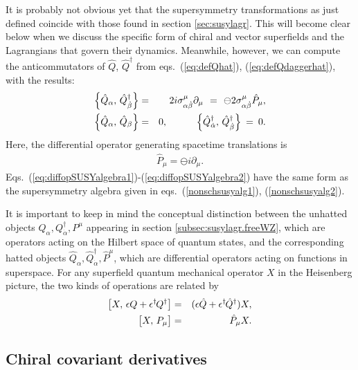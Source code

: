 \documentclass[11pt]{article}
\def\BDpos{}
\def\BDpos{-}
\def\BDpos{\oplus}
\def\BDpos{\ominus}
\def\beq{\begin{eqnarray}}
\def\eeq{\end{eqnarray}}
\begin{document}
It is probably not obvious yet that the supersymmetry transformations as 
just defined coincide with those found in section \ref{sec:susylagr}. 
This will become clear below when we discuss the specific form of chiral 
and vector superfields and the Lagrangians that govern their dynamics. 
Meanwhile, however, we can compute the anticommutators of $\hat Q$, $\hat 
Q^\dagger$ from eqs.~(\ref{eq:defQhat}), (\ref{eq:defQdaggerhat}), with 
the results:
\beq
\Bigl \lbrace \hat Q_\alpha,\, \hat Q^\dagger_{\dot\beta} \Bigr \rbrace
&=& 
2 i \sigma^\mu_{\alpha\dot\beta}\partial_\mu
\>\,=\,\> \BDpos 2 \sigma^\mu_{\alpha\dot\beta} \hat P_\mu,
\label{eq:diffopSUSYalgebra1}
\\
\Bigl \lbrace \hat Q_\alpha,\, \hat Q_{\beta} \Bigr \rbrace &=& 0,\qquad\quad
\Bigl \lbrace \hat Q^\dagger_{\dot \alpha},\, \hat Q^\dagger_{\dot\beta} 
\Bigr \rbrace \>=\> 0.
\label{eq:diffopSUSYalgebra2}
\eeq
Here, the differential operator generating spacetime translations is   
\beq
\hat P_\mu = \BDpos i \partial_\mu.
\eeq
Eqs.~(\ref{eq:diffopSUSYalgebra1})-(\ref{eq:diffopSUSYalgebra2}) have the same 
form as the supersymmetry algebra given in 
eqs.~(\ref{nonschsusyalg1}), (\ref{nonschsusyalg2}). 

It is important to keep in 
mind the conceptual distinction between the unhatted objects 
$Q_\alpha, Q^\dagger_{\dot\alpha}, 
P^\mu$ appearing in section \ref{subsec:susylagr.freeWZ}, 
which are operators acting on the Hilbert space of quantum states,
and the corresponding hatted objects 
$\hat Q_\alpha, \hat Q^\dagger_{\dot\alpha},
\hat P^\mu$, which are differential operators acting on functions in 
superspace. For any superfield
quantum mechanical operator $X$ in the Heisenberg picture, 
the two kinds of operations are related by 
\beq
\bigl [X,\, \epsilon Q + \epsilon^\dagger\hspace{-1pt} Q^\dagger \bigr ]
&=&
(\epsilon \hat Q + \epsilon^\dagger\hspace{-1pt} \hat Q^\dagger) X ,
\\
\bigl [X ,\, P_\mu \bigr ] &=& \hat P_\mu X.
\eeq

\subsection{Chiral covariant derivatives\label{subsec:supercovariantderivatives}}
\setcounter{equation}{0}
\setcounter{footnote}{2}
\end{document}
